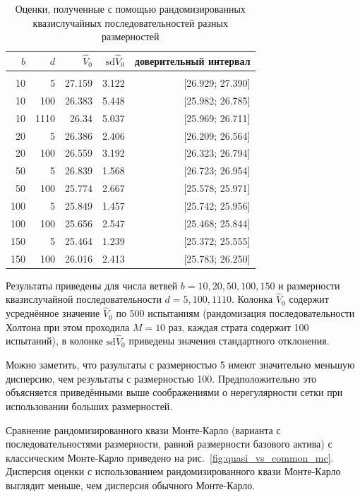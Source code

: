 \documentclass[specialist,
               substylefile = ../spbu.rtx,
               subf,href,colorlinks=true, 12pt]{disser}
\newcommand{\Vhat}{\hat{V}}
\begin{document}
\begin{table}
	\renewcommand{\arraystretch}{0.6}
	\centering
	\caption{Оценки, полученные с помощью рандомизированных квазислучайных последовательностей разных размерностей}
	\begin{tabular}{rrrrr}
		$b$&$d$&$\Vhat_0$&$\mathrm{sd}\Vhat_0$&доверительный интервал\\[5pt]\hline\\
		10&5&27.159&3.122&[26.929; 27.390]\\
		10&100&26.383&5.448&[25.982; 26.785]\\
		10&1110&26.34&5.037&[25.969; 26.711]\\[5pt]
		20&5&26.386&2.406&[26.209; 26.564]\\
		20&100&26.559&3.192&[26.323; 26.794]\\[5pt]
		50&5&26.839&1.568&[26.723; 26.954]\\
		50&100&25.774&2.667&[25.578; 25.971]\\[5pt]
		100&5&25.849&1.457&[25.742; 25.956]\\
		100&100&25.656&2.547&[25.468; 25.844]\\[5pt]
		150&5&25.464&1.239&[25.372; 25.555]\\
		150&100&26.016&2.413&[25.783; 26.250]\\[10pt]
	\end{tabular}
	\label{tbl:halton_estimators}

	\footnotesize
	Результаты приведены для числа ветвей $b = 10, 20, 50, 100, 150$ и размерности квазислучайной последовательности $d = 5, 100, 1110$. Колонка $\Vhat_0$ содержит усреднённое значение $\Vhat_0$ по 500 испытаниям (рандомизация последовательности Холтона при этом проходила $M = 10$ раз, каждая страта содержит 100 испытаний), в колонке $\mathrm{sd}\Vhat_0$ приведены значения стандартного отклонения.
\end{table}

Можно заметить, что разультаты с размерностью 5 имеют значительно меньшую дисперсию, чем результаты с размерностью 100. Предположительно это объясняется приведёнными выше соображениями о нерегулярности сетки при использовании больших размерностей.

Сравнение рандомизированного квази Монте-Карло (варианта с последовательностями размерности, равной размерности базового актива) с классическим Монте-Карло приведено на рис.~\ref{fig:quasi_vs_common_mc}. Дисперсия оценки с использованием рандомизированного квази Монте-Карло выглядит меньше, чем дисперсия обычного Монте-Карло.
\end{document}
